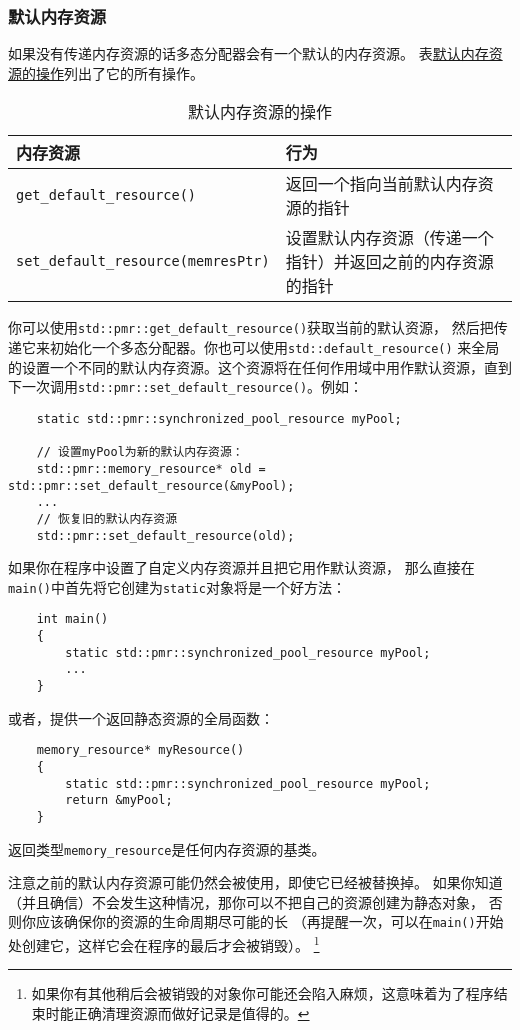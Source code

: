 \subsubsection{默认内存资源}
如果没有传递内存资源的话多态分配器会有一个默认的内存资源。
表\hyperref[t29.2]{默认内存资源的操作}列出了它的所有操作。
\begin{table}[ht]
    \centering
    \begin{tabular}{l|p{}}
        \hline
        \textbf{内存资源}                              & \textbf{行为}                   \\
        \hline
        \texttt{get\_default\_resource()}          & 返回一个指向当前默认内存资源的指针             \\
        \texttt{set\_default\_resource(memresPtr)} & 设置默认内存资源（传递一个指针）并返回之前的内存资源的指针 \\
        \hline
    \end{tabular}
    \caption{默认内存资源的操作}
    \label{t29.2}
\end{table}

你可以使用\texttt{std::pmr::get\_default\_resource()}获取当前的默认资源，
然后把传递它来初始化一个多态分配器。你也可以使用\texttt{std::default\_resource()}
来全局的设置一个不同的默认内存资源。这个资源将在任何作用域中用作默认资源，直到
下一次调用\texttt{std::pmr::set\_default\_resource()}。例如：
\begin{lstlisting}
    static std::pmr::synchronized_pool_resource myPool;

    // 设置myPool为新的默认内存资源：
    std::pmr::memory_resource* old = std::pmr::set_default_resource(&myPool);
    ...
    // 恢复旧的默认内存资源
    std::pmr::set_default_resource(old);
\end{lstlisting}
如果你在程序中设置了自定义内存资源并且把它用作默认资源，
那么直接在\texttt{main()}中首先将它创建为\texttt{static}对象将是一个好方法：
\begin{lstlisting}
    int main()
    {
        static std::pmr::synchronized_pool_resource myPool;
        ...
    }
\end{lstlisting}
或者，提供一个返回静态资源的全局函数：
\begin{lstlisting}
    memory_resource* myResource()
    {
        static std::pmr::synchronized_pool_resource myPool;
        return &myPool;
    }
\end{lstlisting}
返回类型\texttt{memory\_resource}是任何内存资源的基类。

注意之前的默认内存资源可能仍然会被使用，即使它已经被替换掉。
如果你知道（并且确信）不会发生这种情况，那你可以不把自己的资源创建为静态对象，
否则你应该确保你的资源的生命周期尽可能的长
（再提醒一次，可以在\texttt{main()}开始处创建它，这样它会在程序的最后才会被销毁）。
\footnote{如果你有其他稍后会被销毁的对象你可能还会陷入麻烦，这意味着为了程序结束时能正确清理资源而做好记录是值得的。}

